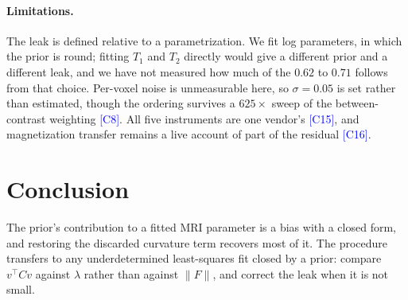\documentclass{article}
\newcommand{\claim}[1]{\textcolor{blue}{\footnotesize[#1]}}
\newcommand{\claim}[1]{\unskip}
\begin{document}
\paragraph{Limitations.} The leak is defined relative to a parametrization. We fit log
parameters, in which the prior is round; fitting $T_1$ and $T_2$ directly would give a different prior and a different leak, and we
have not measured how much of the $0.62$ to $0.71$ follows from that choice. Per-voxel noise is unmeasurable here, so $\sigma = 0.05$ is
set rather than estimated, though the ordering survives a $625\times$ sweep of the
between-contrast weighting \claim{C8}. All five instruments are one vendor's \claim{C15}, and
magnetization transfer remains a live account of part of the residual \claim{C16}.

\section{Conclusion}

The prior's contribution to a fitted MRI parameter is a bias with a closed form, and restoring
the discarded curvature term recovers most of it. The procedure transfers to any underdetermined
least-squares fit closed by a prior: compare $v^\top C v$ against $\lambda$ rather than against
$\|F\|$, and correct the leak when it is not small.
\end{document}
